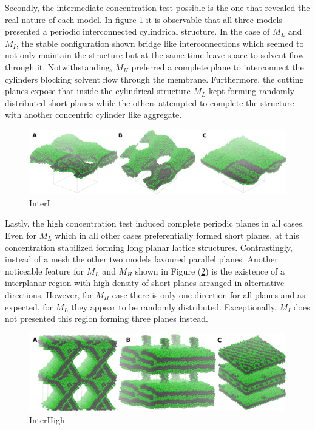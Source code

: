 \documentclass[10pt,a4paper,twoside]{article}
\begin{document}
Secondly, the intermediate concentration test possible is the one that revealed the real nature of each model. In figure \ref{Fig:InterI} it is observable that all three models presented a periodic interconnected cylindrical structure. In the case of $M_L$ and $M_I$, the stable configuration shown bridge like interconnections which seemed to not only maintain the structure but at the same time leave space to solvent flow through it. Notwithstanding, $M_H$ preferred a complete plane to interconnect the cylinders blocking solvent flow through the membrane. Furthermore, the cutting planes expose that inside the cylindrical structure $M_L$ kept forming randomly distributed short planes while the others attempted to complete the structure with another concentric cylinder like aggregate. 

\begin{figure}[H]
  \begin{center}
	\includegraphics[width=1 \textwidth]{./images/InterI}
	\caption{InterI}
	\label{Fig:InterI}
  \end{center}
\end{figure} 

Lastly, the high concentration test induced complete periodic planes in all cases. Even for $M_L$ which in all other cases preferentially formed short planes, at this concentration stabilized forming long planar lattice structures. Contrastingly, instead of a mesh the other two models favoured parallel planes. Another noticeable feature for $M_L$ and $M_H$ shown in Figure (\ref{Fig:InterHigh}) is the existence of a interplanar region with high density of short planes arranged in alternative directions. However, for $M_H$ case there is only one direction for all planes and as expected, for $M_L$  they appear to be randomly distributed. Exceptionally, $M_I$ does not presented this region forming three planes instead. 

\begin{figure}[H]
  \begin{center}
	\includegraphics[width=1 \textwidth]{./images/InterHigh}
	\caption{InterHigh}
	\label{Fig:InterHigh}
  \end{center}
\end{figure} 
\end{document}
